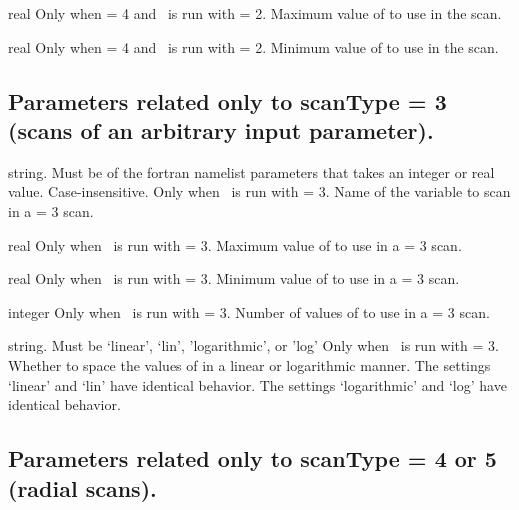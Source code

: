 \myhrule

{real}
{Only when  = 4 and \sfincsScan~is run with  = 2.}
{Maximum value of  to use in the scan.}

\myhrule

{real}
{Only when  = 4 and \sfincsScan~is run with  = 2.}
{Minimum value of  to use in the scan.}

\subsection{Parameters related only to {\ttfamily scanType} = 3 (scans of an arbitrary input parameter).}

{string. Must be of the fortran namelist parameters that takes an integer or real value. Case-insensitive.}
{Only when \sfincsScan~is run with  = 3.}
{Name of the variable to scan in a  = 3 scan.}

\myhrule

{real}
{Only when \sfincsScan~is run with  = 3.}
{Maximum value of  to use in a  = 3 scan.}

\myhrule

{real}
{Only when \sfincsScan~is run with  = 3.}
{Minimum value of  to use in a  = 3 scan.}

\myhrule

{integer}
{Only when \sfincsScan~is run with  = 3.}
{Number of values of  to use in a  = 3 scan.}

\myhrule

{string. Must be `linear', `lin', 'logarithmic', or 'log'}
{Only when \sfincsScan~is run with  = 3.}
{Whether to space the values of  in a linear or logarithmic manner.
The settings `linear' and `lin' have identical behavior. 
The settings `logarithmic' and `log' have identical behavior.}

\myhrule


\subsection{Parameters related only to {\ttfamily scanType} = 4 or 5 (radial scans).}

